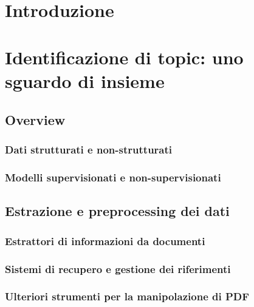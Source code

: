 \documentclass[12pt,a4paper,twoside]{book}
\begin{document}
\tableofcontents

\listoffigures
\listoftables
\lstlistoflistings

\pagestyle{empty}
\newpage~\newpage
\thispagestyle{empty}

\clearpage
{}
\pagestyle{plain}

\chapter{Introduzione}


\chapter{Identificazione di topic: uno sguardo di insieme}
\label{2.0}


\section{Overview}


\subsection{Dati strutturati e non-strutturati}


\subsection{Modelli supervisionati e non-supervisionati}


\section{Estrazione e preprocessing dei dati}
\label{2.2}


\subsection{Estrattori di informazioni da documenti}


\subsection{Sistemi di recupero e gestione dei riferimenti}


\subsection{Ulteriori strumenti per la manipolazione di PDF}
\label{2.2.3}

\end{document}

